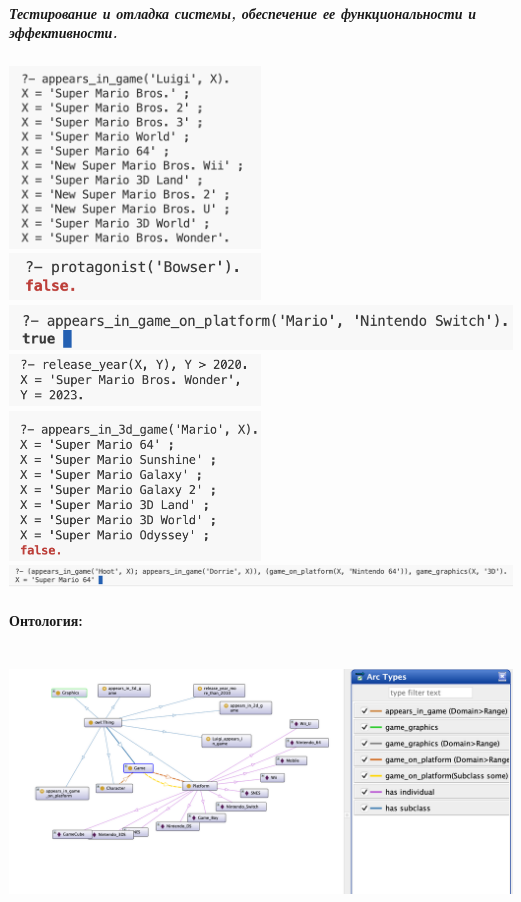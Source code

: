 \documentclass[12pt,onecolumn]{article}
\newcommand{\nparagraph}[1]{\paragraph{#1}\mbox{}\\}
\begin{document}

\subparagraph{Тестирование и отладка системы, обеспечение ее функциональности и эффективности.}

\includegraphics[width=0.5\textwidth]{image/prolog-test-1.png}
\includegraphics[width=0.5\textwidth]{image/prolog-test-2.png}
\includegraphics[width=\textwidth]{image/prolog-test-3.png}
\includegraphics[width=0.5\textwidth]{image/prolog-test-4.png}
\includegraphics[width=0.5\textwidth]{image/prolog-test-5.png}
\includegraphics[width=\textwidth]{image/prolog-test-6.png}
\nparagraph{Онтология:}
\includegraphics[width=\textwidth]{image/ontology-1.png}
\end{document}
